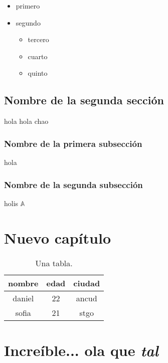 \begin{itemize}
\item primero
\item segundo
\begin{itemize}
\item tercero
\item cuarto
\item quinto
\end{itemize}
\end{itemize}

\section{Nombre de la segunda sección}

hola hola chao

\subsection{Nombre de la primera subsección}

hola

\subsection{Nombre de la segunda subsección}

holis \(\mathbb{A}\)

\chapter{Nuevo capítulo}

\thispagestyle{fancy}

\begin{table}[h]
\centering
\begin{tabu}{ccc}
\hline\rowfont{\bfseries}
nombre & edad & ciudad \\
\hline
daniel & 22 & ancud \\
sofia & 21 & stgo \\
\hline
\end{tabu}
\caption{Una tabla.}
\label{tab:tab1}
\end{table}










\setcounter{chapter}{14}

\chapter{Increíble... ola que \emph{tal}}

\thispagestyle{fancy}




